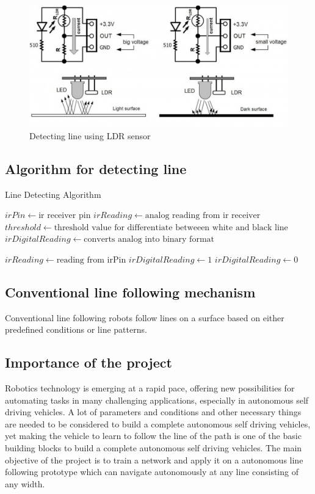 \documentclass[14pt,a4paper]{extarticle}
\begin{document}
		\begin{figure}[!h]
			\includegraphics[width=\textwidth]{ldr_line.jpg}
			\caption{Detecting line using LDR sensor}
			\label{fig:detect_line_ldr}
		\end{figure}
			\subsection{Algorithm for detecting line}
		\begin{algorithm}
		\caption{Line Detecting Algorithm}\label{linetracker}
		\begin{algorithmic}[1]
		
		\State $irPin \gets \text{ir receiver pin}$
		\State $irReading \gets \text {analog reading from ir receiver} $
		\State $threshold \gets \text {threshold value for differentiate betweeen white and black line} $
		\State $irDigitalReading \gets \text {converts analog into binary format} $
		
		\State $ irReading \gets \text{reading from irPin}$		
		\State $irDigitalReading \gets 1$
		\Else 
		\State $irDigitalReading \gets 0$
		\EndIf
		\EndProcedure
		\end{algorithmic}
		\end{algorithm}
		


	\subsection{Conventional line following mechanism}
	
	Conventional line following robots follow lines on a surface based on either predefined conditions or line patterns. 
	

	\subsection{Importance of the project}
	
	Robotics technology is emerging at a rapid pace, offering new possibilities for automating tasks in many challenging applications, especially in autonomous self driving vehicles. A lot of parameters and conditions and other necessary things are needed to be considered to build a complete autonomous self driving vehicles, yet making the vehicle to learn to follow the line of the path is one of the basic building blocks to build a complete autonomous self driving vehicles. The main objective of the project is to train a network and apply it on a autonomous line following prototype which can navigate autonomously at any line consisting of any width. 
\end{document}
